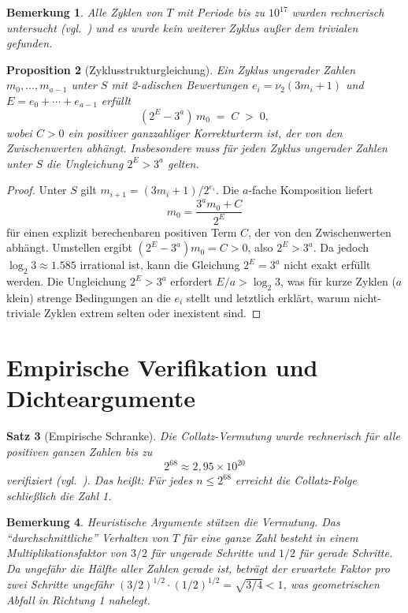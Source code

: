 \documentclass[12pt,a4paper]{article}
\newtheorem{theorem}{Satz}[section]
\newtheorem{proposition}[theorem]{Proposition}
\newtheorem{remark}[theorem]{Bemerkung}
\begin{document}
\begin{remark}\label{rem:cycle_search}
Alle Zyklen von $T$ mit Periode bis zu $10^{17}$ wurden rechnerisch untersucht
(vgl.\ \cite{Leavens1992}) und es wurde kein weiterer Zyklus außer dem trivialen gefunden.
\end{remark}

\begin{proposition}[Zyklusstrukturgleichung]\label{prop:cycle_eq}
Ein Zyklus ungerader Zahlen $m_0, \ldots, m_{a-1}$ unter $S$ mit 2-adischen Bewertungen
$e_i = \nu_2(3m_i + 1)$ und $E = e_0 + \cdots + e_{a-1}$ erfüllt
\begin{equation}\label{eq:cycle_cond}
  (2^E - 3^a)\, m_0 \;=\; C \;>\; 0,
\end{equation}
wobei $C > 0$ ein positiver ganzzahliger Korrekturterm ist, der von den Zwischenwerten abhängt.
Insbesondere muss für jeden Zyklus ungerader Zahlen unter $S$ die Ungleichung $2^E > 3^a$ gelten.
\end{proposition}

\begin{proof}
Unter $S$ gilt $m_{i+1} = (3m_i + 1) / 2^{e_i}$. Die $a$-fache Komposition liefert
\[
  m_0 = \frac{3^a m_0 + C}{2^E}
\]
für einen explizit berechenbaren positiven Term $C$, der von den Zwischenwerten abhängt.
Umstellen ergibt $(2^E - 3^a) m_0 = C > 0$, also $2^E > 3^a$.
Da jedoch $\log_2 3 \approx 1.585$ irrational ist, kann die Gleichung $2^E = 3^a$ nicht
exakt erfüllt werden. Die Ungleichung $2^E > 3^a$ erfordert $E/a > \log_2 3$, was
für kurze Zyklen ($a$ klein) strenge Bedingungen an die $e_i$ stellt und letztlich
erklärt, warum nicht-triviale Zyklen extrem selten oder inexistent sind.
\end{proof}

\section{Empirische Verifikation und Dichteargumente}

\begin{theorem}[Empirische Schranke]\label{thm:empirical}
Die Collatz-Vermutung wurde rechnerisch für alle positiven ganzen Zahlen bis zu
\[
  2^{68} \approx 2{,}95 \times 10^{20}
\]
verifiziert (vgl.\ \cite{Barina2020}). Das heißt: Für jedes $n \leq 2^{68}$ erreicht
die Collatz-Folge schließlich die Zahl 1.
\end{theorem}

\begin{remark}\label{rem:heuristics}
Heuristische Argumente stützen die Vermutung. Das ``durchschnittliche'' Verhalten von $T$
für eine ganze Zahl besteht in einem Multiplikationsfaktor von $3/2$ für ungerade Schritte
und $1/2$ für gerade Schritte. Da ungefähr die Hälfte aller Zahlen gerade ist, beträgt
der erwartete Faktor pro zwei Schritte ungefähr $(3/2)^{1/2} \cdot (1/2)^{1/2} = \sqrt{3/4} < 1$,
was geometrischen Abfall in Richtung 1 nahelegt.
\end{remark}
\end{document}
